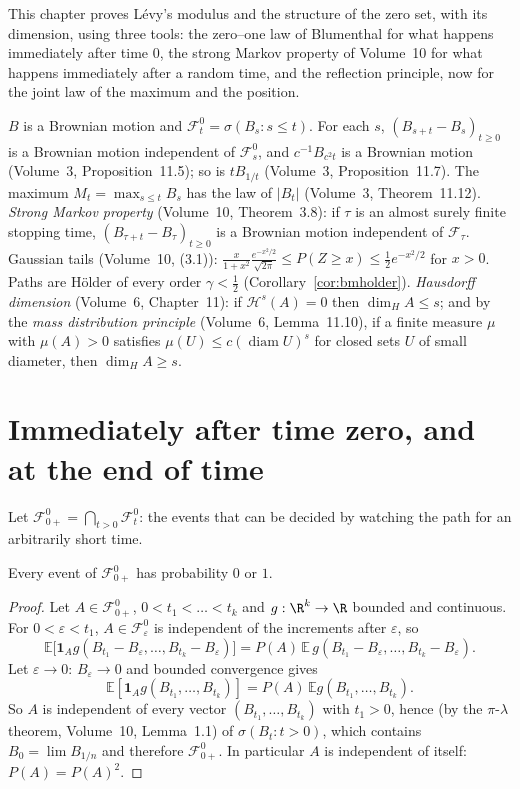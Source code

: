 This chapter proves L\'evy's modulus and the structure of the zero set, with its dimension, using three tools: the zero--one law of Blumenthal for what happens immediately
after time $0$, the strong Markov property of Volume~10 for what happens immediately after a random time, and the reflection principle, now for the joint law of the maximum
and the position.

\begin{reminder}
$B$ is a Brownian motion and $\mathcal F^0_t=\sigma(B_s:s\le t)$. For each $s$, $(B_{s+t}-B_s)_{t\ge0}$ is a Brownian motion independent of $\mathcal F^0_s$, and $c^{-1}B_{c^2t}$ is a Brownian motion
(Volume~3, Proposition~11.5); so is $tB_{1/t}$ (Volume~3, Proposition~11.7). The maximum $M_t=\max_{s\le t}B_s$ has the law of $|B_t|$ (Volume~3, Theorem~11.12). \emph{Strong Markov property}
(Volume~10, Theorem~3.8): if $\tau$ is an almost surely finite stopping time, $(B_{\tau+t}-B_\tau)_{t\ge0}$ is a Brownian motion independent of $\mathcal F_\tau$. Gaussian tails (Volume~10, (3.1)):
$\frac x{1+x^2}\frac{e^{-x^2/2}}{\sqrt{2\pi}}\le P(Z\ge x)\le\frac12e^{-x^2/2}$ for $x>0$. Paths are H\"older of every order $\gamma<\frac12$ (Corollary~\ref{cor:bmholder}). \emph{Hausdorff dimension} (Volume~6, Chapter~11):
if $\mathcal H^s(A)=0$ then $\dim_HA\le s$; and by the \emph{mass distribution principle} (Volume~6, Lemma~11.10), if a finite measure $\mu$ with $\mu(A)>0$ satisfies $\mu(U)\le c(\operatorname{diam}U)^s$ for closed sets
$U$ of small diameter, then $\dim_HA\ge s$.
\end{reminder}

\section{Immediately after time zero, and at the end of time}

Let $\mathcal F^0_{0+}=\bigcap_{t>0}\mathcal F^0_t$: the events that can be decided by watching the path for an arbitrarily short time.

\begin{theorem}\label{thm:blumenthal}
Every event of $\mathcal F^0_{0+}$ has probability $0$ or $1$.
\end{theorem}

\begin{proof}
Let $A\in\mathcal F^0_{0+}$, $0<t_1<\dots<t_k$ and $g:\R^k\to\R$ bounded and continuous. For $0<\varepsilon<t_1$, $A\in\mathcal F^0_\varepsilon$ is independent of the increments after $\varepsilon$, so
\[
\mathbb E\bigl[\mathbf 1_Ag(B_{t_1}-B_\varepsilon,\dots,B_{t_k}-B_\varepsilon)\bigr]=P(A)\,\mathbb E\,g(B_{t_1}-B_\varepsilon,\dots,B_{t_k}-B_\varepsilon).
\]
Let $\varepsilon\to0$: $B_\varepsilon\to0$ and bounded convergence gives
\[\mathbb E[\mathbf 1_Ag(B_{t_1},\dots,B_{t_k})]=P(A)\,\mathbb E g(B_{t_1},\dots,B_{t_k}).\] So $A$ is independent of every vector
$(B_{t_1},\dots,B_{t_k})$ with $t_1>0$, hence (by the $\pi$-$\lambda$ theorem, Volume~10, Lemma~1.1) of $\sigma(B_t:t>0)$, which contains $B_0=\lim B_{1/n}$ and therefore $\mathcal F^0_{0+}$. In particular $A$ is
independent of itself: $P(A)=P(A)^2$.
\end{proof}

